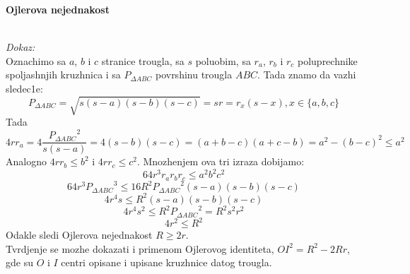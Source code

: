 \documentclass[11pt]{article}
\newcommand{\D}{\displaystyle}
\begin{document}
\vspace{1cm}
\begin{center}
    \LARGE\textbf{Ojlerova nejednakost}
\end{center}
\begin{flushleft}
\\
\vspace{0.5cm}
\textit{Dokaz:}\\
\vspace{0.5cm}
Oznachimo sa $a$, $b$ i $c$ stranice trougla, sa $s$ poluobim, sa $r_a$, $r_b$ i $r_c$ poluprechnike spoljashnjih kruzhnica i sa $P_{\Delta ABC}$ povrshinu trougla $ABC$. Tada znamo da vazhi sledec1e:
$$P_{\Delta ABC}=\sqrt{s(s-a)(s-b)(s-c)}=sr=r_x(s-x),x\in \{a,b,c\}$$ Tada
$$\D 4rr_a=4\frac{{P_{\Delta ABC}}^2}{s(s-a)}=4(s-b)(s-c)=(a+b-c)(a+c-b)=a^2-(b-c)^2\leq a^2$$
Analogno $4rr_b\leq b^2$ i $4rr_c\leq c^2$. Mnozhenjem ova tri izraza dobijamo:
$$\D 64r^3r_a r_b r_c\leq a^2b^2c^2$$
$$\D 64r^3{P_{\Delta ABC}}^3\leq 16R^2{P_{\Delta ABC}}^2(s-a)(s-b)(s-c)$$
$$\D 4r^4s\leq R^2(s-a)(s-b)(s-c)$$
$$\D 4r^4s^2\leq R^2 {P_{\Delta ABC}}^2=R^2s^2r^2$$
$$\D 4r^2\leq R^2$$
Odakle sledi Ojlerova nejednakost $R\geq 2r$.\\
\vspace{0.5cm}
Tvrdjenje se mozhe dokazati i primenom Ojlerovog identiteta, $OI^2 = R^2 - 2Rr$, gde su $O$ i $I$ centri opisane i upisane kruzhnice datog trougla.



\end{flushleft}
\end{document}
